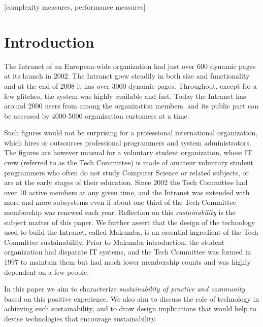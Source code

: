 \documentclass{acm_proc_article-sp}
\begin{document}
[complexity measures, performance measures]


\section{Introduction}\label{sec:introduction}
The Intranet of an European-wide organization had just over 600 dynamic pages at its launch in 2002. The Intranet grew steadily in both size and functionality
 and at the end of 2008 it has over 3000 dynamic pages. Throughout, except for a few glitches, the system was highly available and fast. Today the Intranet has around 2000 users from among the organization members, and its public part can be accessed by 4000-5000 organization customers at a time.

Such figures would not be surprising for a professional international organization, which hires or outsources professional programmers and system administrators. 
The figures are however unusual for a voluntary student organization, whose IT crew (referred to as the Tech Committee) is made of amateur voluntary student programmers who often do not study Computer Science or related subjects, or are at the early stages of their education.  
Since 2002  the Tech Committee had over 10 active members at any given time, and the Intranet was extended with more and more subsystems even if about one third of the Tech Committee membership was renewed each year. Reflection on this {\it sustainability} is the subject matter of this paper. We further assert that the design of the technology used to build the Intranet, called Makumba, is an essential ingredient of the Tech Committee sustainability.
Prior to Makumba introduction, the student organization had disparate IT systems, and the Tech Committee was formed in 1997 to maintain them but had much lower membership counts and was highly dependent on a few people.

In this paper we aim to characterize {\it sustainability of practice and community} based on this positive experience. We also aim to discuss the role of technology in achieving such sustainability, and to draw design implications that would help to devise technologies that encourage sustainability. 
\end{document}
